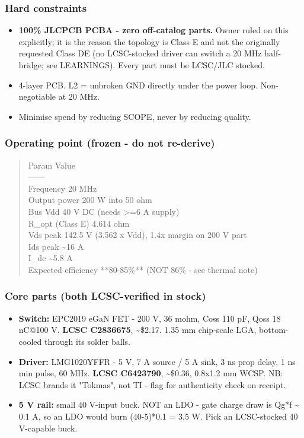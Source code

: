 \documentclass[11pt,a4paper]{article}
\begin{document}
\subsubsection*{Hard constraints}
\begin{itemize}
\item \textbf{100\% JLCPCB PCBA - zero off-catalog parts.} Owner ruled on this explicitly; it is the reason
the topology is Class E and not the originally requested Class DE (no LCSC-stocked driver can
switch a 20 MHz half-bridge; see LEARNINGS). Every part must be LCSC/JLC stocked.
\item 4-layer PCB. L2 = unbroken GND directly under the power loop. Non-negotiable at 20 MHz.
\item Minimise spend by reducing SCOPE, never by reducing quality.
\end{itemize}
\subsubsection*{Operating point (frozen - do not re-derive)}
\begin{quote}\small\ttfamily\raggedright
\textbar{} Param \textbar{} Value \textbar{}\\
\textbar{}---\textbar{}---\textbar{}\\
\textbar{} Frequency \textbar{} 20 MHz \textbar{}\\
\textbar{} Output power \textbar{} 200 W into 50 ohm \textbar{}\\
\textbar{} Bus Vdd \textbar{} 40 V DC (needs \textgreater{}=6 A supply) \textbar{}\\
\textbar{} R\_opt (Class E) \textbar{} 4.614 ohm \textbar{}\\
\textbar{} Vds peak \textbar{} 142.5 V (3.562 x Vdd), 1.4x margin on 200 V part \textbar{}\\
\textbar{} Ids peak \textbar{} \textasciitilde{}16 A \textbar{}\\
\textbar{} I\_dc \textbar{} \textasciitilde{}5.8 A \textbar{}\\
\textbar{} Expected efficiency \textbar{} {*}{*}80-85\%{*}{*} (NOT 86\% - see thermal note) \textbar{}
\end{quote}
\subsubsection*{Core parts (both LCSC-verified in stock)}
\begin{itemize}
\item \textbf{Switch:} EPC2019 eGaN FET - 200 V, 36 mohm, Coss 110 pF, Qoss 18 nC@100 V. \textbf{LCSC C2836675},
\textasciitilde{}\$2.17. 1.35 mm chip-scale LGA, bottom-cooled through its solder balls.
\item \textbf{Driver:} LMG1020YFFR - 5 V, 7 A source / 5 A sink, 3 ns prop delay, 1 ns min pulse, 60 MHz.
\textbf{LCSC C6423790}, \textasciitilde{}\$0.36, 0.8x1.2 mm WCSP. NB: LCSC brands it "Tokmas", not TI - flag for
authenticity check on receipt.
\item \textbf{5 V rail:} small 40 V-input buck. NOT an LDO - gate charge draw is Qg{*}f \textasciitilde{} 0.1 A, so an LDO
would burn (40-5){*}0.1 = 3.5 W. Pick an LCSC-stocked 40 V-capable buck.
\end{itemize}
\end{document}
